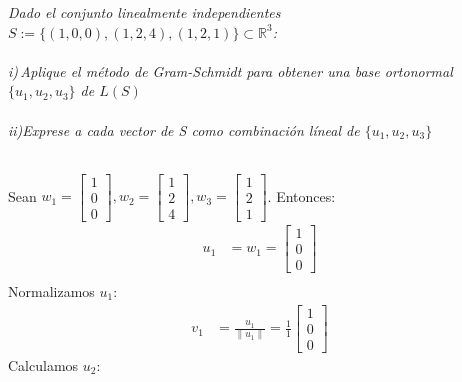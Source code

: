\documentclass[11pt,letterpaper]{article}
\newcommand{\R}{\mathbb{R}}
\begin{document}
\newpage
\begin{tcolorbox}[
	title = \textcolor{black}{\textcolor{white}{Problema 10}},]
\textit{Dado el conjunto linealmente independientes $S:=\{(1,0,0),(1,2,4),(1,2,1)\}\subset \R^3$:\,\\
\,\\
i)\,Aplique el m\'etodo de Gram-Schmidt para obtener una base ortonormal $\{u_1,u_2,u_3\}$ de $L(S)$\,\\
\,\\
ii)Exprese a cada vector de S como combinaci\'on l\'ineal de $\{u_1,u_2,u_3\}$
}
\end{tcolorbox}\,\\

Sean $w_1=\begin{bmatrix} 1\\0\\0 \end{bmatrix}, w_2=\begin{bmatrix} 1\\2\\4 \end{bmatrix}, w_3=\begin{bmatrix} 1\\2\\1 \end{bmatrix}$. Entonces:
\begin{align*}
    u_1&=w_1=\begin{bmatrix} 1\\0\\0 \end{bmatrix}\\
\end{align*}
Normalizamos $u_1$:
\begin{align*}
    v_1&=\frac{u_1}{\|u_1\|}=\frac{1}{1}\begin{bmatrix} 1\\0\\0 \end{bmatrix}
\end{align*}
Calculamos $u_2$:
\end{document}
